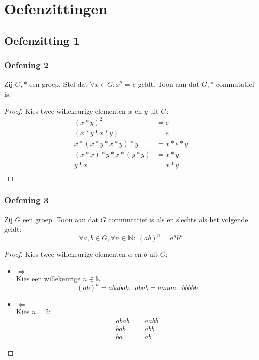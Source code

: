 \documentclass[main.tex]{subfiles}
\begin{document}
\chapter{Oefenzittingen}
\label{cha:oefenzittingen}

\section{Oefenzitting 1}


\subsection{Oefening 2}
\label{oz1-oef2}
Zij $G,*$ een groep.
Stel dat $\forall x \in G: x^{2} = e$ geldt.
Toon aan dat $G,*$ commutatief is.

\begin{proof}
  Kies twee willekeurige elementen $x$ en $y$ uit $G$:
  \[ 
  \begin{array}{rl}
  (x*y)^{2} &= e\\
  (x*y*x*y) &= e\\
  x*(x*y*x*y)*y &= x*e*y\\
  (x*x)*y*x*(y*y) &= x*y\\
  y*x &= x*y\\
  \end{array}
  \]
\end{proof}

\subsection{Oefening 3}
Zij $G$ een groep.
Toon aan dat $G$ commutatief is als en slechts als het volgende geldt:
\[ \forall a,b \in G, \forall n \in \mathbb{N}:\ (ab)^{n} = a^{n}b^{n} \]

\begin{proof}
  Kies twee willekeurige elementen $a$ en $b$ uit $G$:
  \begin{itemize}
  \item $\Rightarrow$\\
    Kies een willekeurige $n\in \mathbb{N}$
    \[ (ab)^{n} = ababab \ldots abab = aaaaa \ldots bbbbb \]
  \item $\Leftarrow$\\
    Kies $n=2$:
    \[ 
    \begin{array}{rl}
       abab &= aabb\\
       bab &= abb\\
       ba &= ab
    \end{array}
    \]
  \end{itemize}
\end{proof}
\end{document}
